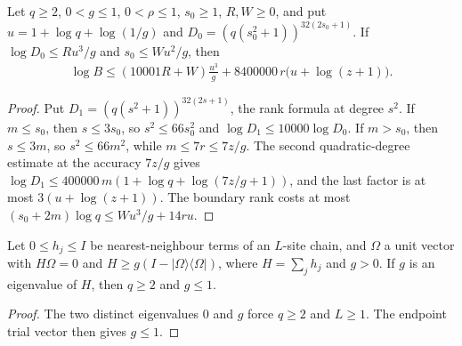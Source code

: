 \begin{lemma}
    \label{lem:aklv_ff_rank_log}
    \leanok
    Let $q\ge2$, $0<g\le1$, $0<\rho\le1$, $s_0\ge1$, $R,W\ge0$, and put
    $u=1+\log q+\log(1/g)$ and $D_0=(q(s_0^2+1))^{32(2s_0+1)}$. If
    $\log D_0\le Ru^3/g$ and $s_0\le Wu^2/g$, then
    \begin{align*}
        \log B\le(10001R+W)\frac{u^3}{g}
        +8400000\,r\bigl(u+\log(z+1)\bigr).
    \end{align*}
\end{lemma}
\begin{proof}
    \leanok
    Put $D_1=(q(s^2+1))^{32(2s+1)}$, the rank formula at degree $s^2$.
    If $m\le s_0$, then $s\le3s_0$, so $s^2\le66s_0^2$ and
    $\log D_1\le10000\log D_0$.
    If $m>s_0$, then $s\le3m$, so $s^2\le66m^2$, while $m\le7r\le7z/g$.
    The second quadratic-degree estimate at the accuracy $7z/g$ gives
    $\log D_1\le400000\,m(1+\log q+\log(7z/g+1))$, and the last factor is at
    most $3(u+\log(z+1))$. The boundary rank costs at most
    $(s_0+2m)\log q\le Wu^3/g+14r u$.
\end{proof}

\begin{lemma}
    \label{lem:aklv_ff_dimension_gap}
    \leanok
    Let $0\le h_j\le I$ be nearest-neighbour terms of an $L$-site chain, and
    $\Omega$ a unit vector with $H\Omega=0$ and
    $H\ge g(I-|\Omega\rangle\langle\Omega|)$, where $H=\sum_jh_j$ and $g>0$.
    If $g$ is an eigenvalue of $H$, then $q\ge2$ and $g\le1$.
\end{lemma}
\begin{proof}
    \leanok
    The two distinct eigenvalues $0$ and $g$ force $q\ge2$ and $L\ge1$.
    The endpoint trial vector then gives $g\le1$.
\end{proof}

